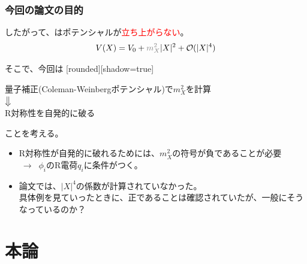 \documentclass[
  unicode,a4paper,9pt,
  xcolor = {dvipsnames,svgnames},
  hyperref ={colorlinks=true,citecolor=Navy,linkcolor=NavyBlue,urlcolor=purple},
  ja=standard,lualatex
]{beamer}
\begin{document}
\begin{frame}
  \frametitle{今回の論文の目的}

  したがって、はポテンシャルが\textcolor{red}{立ち上がらない}。
  \begin{equation}
    V(X)
    =
    V_{0}
    +
    \textcolor{gray}{m_{X}^2}|X|^2
    +
    \mathcal{O}(|X|^4)
    \nonumber
  \end{equation}

  \pause

  そこで、今回は
  [rounded][shadow=true]
  \begin{block}{}
    \centering
    量子補正(Coleman-Weinbergポテンシャル)で$m_{X}^2$を計算\\
    ${\big \Downarrow}$\\
    R対称性を自発的に破る
  \end{block}
  ことを考える。

  \begin{itemize}
    \item
          R対称性が自発的に破れるためには、$m_{X}^2$の符号が負であることが必要\\
          $\ \longrightarrow\ $ $\phi_i$のR電荷$q_{i}$に条件がつく。
    \item
          論文では、$|X|^4$の係数が計算されていなかった。\\
          具体例を見ていったときに、正であることは確認されていたが、一般にそうなっているのか？
  \end{itemize}

\end{frame}

\section{本論}

\begin{frame}[plain]
  \huge \secname
\end{frame}
\end{document}

